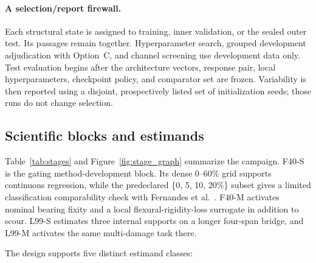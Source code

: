 \paragraph{A selection/report firewall.}
Each structural state is assigned to training, inner validation, or the sealed
outer test. Its passages remain together. Hyperparameter search, grouped
development adjudication with Option~C, and channel screening use development
data only. Test evaluation begins after the architecture vectors, response
pair, local hyperparameters, checkpoint policy, and comparator set are frozen.
Variability is then reported using a disjoint, prospectively listed set of
initialization seeds; those runs do not change selection.

\subsection{Scientific blocks and estimands}
\label{sec:estimands}

Table~\ref{tab:stages} and Figure~\ref{fig:stage_graph} summarize the campaign.
F40-S is the gating method-development block. Its dense 0--60\% grid supports
continuous regression, while the predeclared \{0, 5, 10, 20\%\} subset gives a
limited classification comparability check with Fernandes et
al.~\cite{fernandes2025early}. F40-M activates nominal bearing fixity and a
local flexural-rigidity-loss surrogate in addition to scour. L99-S estimates
three internal supports on a longer four-span bridge, and L99-M activates the
same multi-damage task there.

The design supports five distinct estimand classes:

